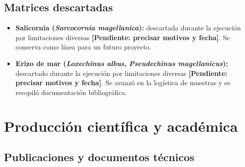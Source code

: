 \documentclass[12pt, a4paper]{article}
\newcommand{\pend}[1]{\textcolor{red!70!black}{\textbf{[Pendiente: #1]}}}
\begin{document}
\subsection{Matrices descartadas}

\begin{itemize}[nosep]
    \item \textbf{Salicornia (\textit{Sarcocornia magellanica}):} descartada durante la ejecución por limitaciones diversas \pend{precisar motivos y fecha}. Se conserva como línea para un futuro proyecto.
    \item \textbf{Erizo de mar (\textit{Loxechinus albus}, \textit{Pseudechinus magellanicus}):} descartado durante la ejecución por limitaciones diversas \pend{precisar motivos y fecha}. Se avanzó en la logística de muestras y se recopiló documentación bibliográfica.
\end{itemize}

\section{Producción científica y académica}

\subsection{Publicaciones y documentos técnicos}
\end{document}
